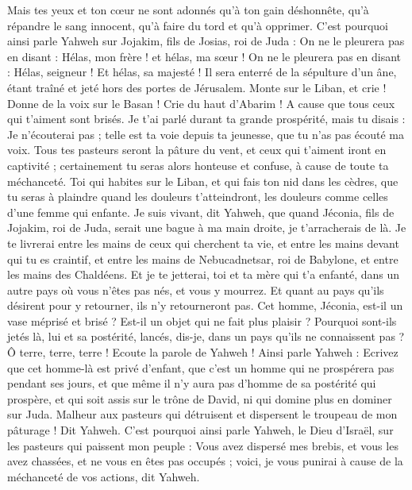\begin{multicols}{2}
Mais tes yeux et ton cœur ne sont adonnés qu'à ton gain déshonnête, qu'à répandre le sang innocent, qu'à faire du tord et qu'à opprimer.
C'est pourquoi ainsi parle Yahweh sur Jojakim, fils de Josias, roi de Juda : On ne le pleurera pas en disant : Hélas, mon frère ! et hélas, ma sœur ! On ne le pleurera pas en disant : Hélas, seigneur ! Et hélas, sa majesté !
Il sera enterré de la sépulture d'un âne, étant traîné et jeté hors des portes de Jérusalem.
Monte sur le Liban, et crie ! Donne de la voix sur le Basan ! Crie du haut d'Abarim ! A cause que tous ceux qui t'aiment sont brisés.
Je t'ai parlé durant ta grande prospérité, mais tu disais : Je n'écouterai pas ; telle est ta voie depuis ta jeunesse, que tu n'as pas écouté ma voix.
Tous tes pasteurs seront la pâture du vent, et ceux qui t'aiment iront en captivité ; certainement tu seras alors honteuse et confuse, à cause de toute ta méchanceté.
Toi qui habites sur le Liban, et qui fais ton nid dans les cèdres, que tu seras à plaindre quand les douleurs t'atteindront, les douleurs comme celles d'une femme qui enfante.
Je suis vivant, dit Yahweh, que quand Jéconia, fils de Jojakim, roi de Juda, serait une bague à ma main droite, je t'arracherais de là.
Je te livrerai entre les mains de ceux qui cherchent ta vie, et entre les mains devant qui tu es craintif, et entre les mains de Nebucadnetsar, roi de Babylone, et entre les mains des Chaldéens.
Et je te jetterai, toi et ta mère qui t'a enfanté, dans un autre pays où vous n'êtes pas nés, et vous y mourrez.
Et quant au pays qu'ils désirent pour y retourner, ils n'y retourneront pas.
Cet homme, Jéconia, est-il un vase méprisé et brisé ? Est-il un objet qui ne fait plus plaisir ? Pourquoi sont-ils jetés là, lui et sa postérité, lancés, dis-je, dans un pays qu'ils ne connaissent pas ?
Ô terre, terre, terre ! Ecoute la parole de Yahweh !
Ainsi parle Yahweh : Ecrivez que cet homme-là est privé d'enfant, que c'est un homme qui ne prospérera pas pendant ses jours, et que même il n'y aura pas d'homme de sa postérité qui prospère, et qui soit assis sur le trône de David, ni qui domine plus en dominer sur Juda.
\VerseOne{}Malheur aux pasteurs qui détruisent et dispersent le troupeau de mon pâturage ! Dit Yahweh.
C'est pourquoi ainsi parle Yahweh, le Dieu d'Israël, sur les pasteurs qui paissent mon peuple : Vous avez dispersé mes brebis, et vous les avez chassées, et ne vous en êtes pas occupés ; voici, je vous punirai à cause de la méchanceté de vos actions, dit Yahweh.

\end{multicols}
